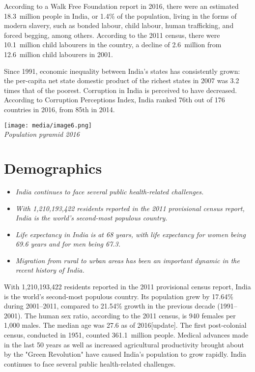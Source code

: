 According to a Walk Free Foundation report in 2016, there were an
estimated 18.3~million people in India, or 1.4\% of the population,
living in the forms of modern slavery, such as bonded labour, child
labour, human trafficking, and forced begging, among others. According
to the 2011 census, there were 10.1~million child labourers in the
country, a decline of 2.6~million from 12.6~million child labourers in
2001.

Since 1991, economic inequality between India's states has consistently
grown: the per-capita net state domestic product of the richest states
in 2007 was 3.2 times that of the poorest. Corruption in India is
perceived to have decreased. According to Corruption Perceptions Index,
India ranked 76th out of 176 countries in 2016, from 85th in 2014.

\texttt{[image: media/image6.png]}\\
\emph{Population pyramid 2016}

\section{Demographics}\label{demographics}

\begin{itemize}
\item
  \emph{India continues to face several public health-related
  challenges.}
\item
  \emph{With 1,210,193,422 residents reported in the 2011 provisional
  census report, India is the world's second-most populous country.}
\item
  \emph{Life expectancy in India is at 68 years, with life expectancy
  for women being 69.6 years and for men being 67.3.}
\item
  \emph{Migration from rural to urban areas has been an important
  dynamic in the recent history of India.}
\end{itemize}

With 1,210,193,422 residents reported in the 2011 provisional census
report, India is the world's second-most populous country. Its
population grew by 17.64\% during 2001--2011, compared to 21.54\% growth
in the previous decade (1991--2001). The human sex ratio, according to
the 2011 census, is 940 females per 1,000 males. The median age was 27.6
as of 2016{[}update{]}. The first post-colonial census, conducted in
1951, counted 361.1~million people. Medical advances made in the last 50
years as well as increased agricultural productivity brought about by
the "Green Revolution" have caused India's population to grow rapidly.
India continues to face several public health-related challenges.

